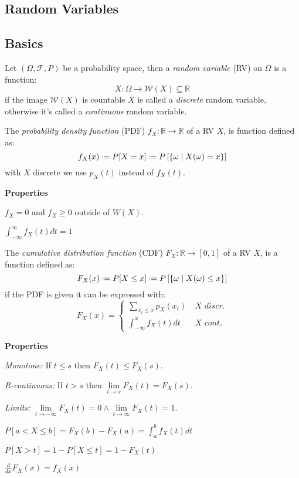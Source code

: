 \documentclass[8pt,a4paper]{extarticle}     %
\newcommand{\R}{\mathbb{R}}
\newcommand{\eqdef}{\mathrel{\vcenter{\baselineskip0.5ex\lineskiplimit0pt\hbox{\scriptsize.}\hbox{\scriptsize.}}}=}
\newcommand{\limcont}[3]{\lim\limits_{#1 \rightarrow #2}{#3}}
\begin{document}
\begin{multicols}{4}
\section{Random Variables}
\subsection{Basics}

\begin{boxdefinition} 
	Let $(\Omega, \mathcal{F}, P)$ be a probability space, then a \textit{random variable} (RV) on $\Omega$ is a function: 
	\[
		X:\Omega\rightarrow \mathcal{W}(X)\subseteq\R
	\]
	if the image $\mathcal{W}(X)$ is countable $X$ is called a \textit{discrete} random variable, otherwise it's called a \textit{continuous} random variable. 
\end{boxdefinition}

\begin{boxdefinition} 
	The \textit{probability density function} (PDF) $f_X:\R\rightarrow\R$ of a RV $X$, is function defined as: 
	\[
		f_X(x) \eqdef P[X = x] \eqdef P\left[\{\omega \mid X(\omega) = x\}\right]
	\]
	with $X$ discrete we use $p_X(t)$ instead of $f_X(t)$.
\end{boxdefinition}
\begin{listb}
	\item [] \textbf{Properties}
	\item $f_X=0$ and $f_X\geq 0$ outside of $W(X)$.
	\item $\int_{-\infty}^{\infty}f_X(t)dt = 1$
\end{listb}
\begin{boxdefinition} 
	The \textit{cumulative distribution function} (CDF) $F_X:\R\rightarrow[0,1]$ of a RV $X$, is a function defined as: 
	\[
		F_X(x) \eqdef P[X \leq x] \eqdef P\left[\{\omega \mid X(\omega) \leq x\}\right]
	\]
	if the PDF is given it can be expressed with:
	\[
		F_X(x) =
		\begin{cases}
			\displaystyle \sum_{x_i\leq x} p_X(x_i) & \ \textit{$X$ discr.}\\[2em]
			\displaystyle \int_{-\infty}^{x} f_X(t)dt & \ \textit{$X$ cont.}
		\end{cases}
	\]
\end{boxdefinition}
\begin{listb}
	\item [] \textbf{Properties}
	\item \textit{Monotone:} If $t\leq s$ then $F_X(t)\leq F_X(s)$. 
	\item \textit{R-continuous:} If $t>s$ then $\limcont{t}{s}{F_X(t)}=F_X(s)$.
	\item \textit{Limits:} $\limcont{t}{-\infty}{F_X(t)}=0 \land \limcont{t}{\infty}{F_X(t)}=1$. 
	\item $P\left[a<X\leq b\right] = F_X(b)-F_X(a) = \int_{a}^{b}f_X(t)dt$ 
	\item $P\left[X > t\right] = 1-P\left[X \leq t\right] = 1 - F_X(t)$
	\item $\frac{d}{dx}F_X(x) = f_X(x)$
\end{listb}


\end{multicols}
\end{document}
